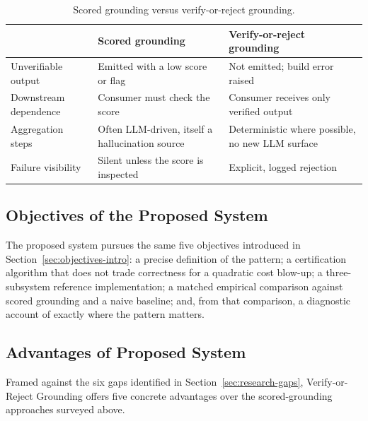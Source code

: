 \documentclass[12pt,a4paper]{report}
\newcommand{\headrow}{\rowcolor{navy}}
\newcommand{\hd}[1]{{\color{white}\bfseries #1}}
\begin{document}
\begin{table}[H]
\centering
\caption{Scored grounding versus verify-or-reject grounding.}
\label{tab:contrast}
\begin{tabular}{@{}p{3.4cm}p{5.0cm}p{5.0cm}@{}}
\toprule
\headrow \hd{} & \hd{Scored grounding} & \hd{Verify-or-reject grounding} \\
\midrule
Unverifiable output & Emitted with a low score or flag & Not emitted; build error raised \\
Downstream dependence & Consumer must check the score & Consumer receives only verified output \\
Aggregation steps & Often LLM-driven, itself a hallucination source & Deterministic where possible, no new LLM surface \\
Failure visibility & Silent unless the score is inspected & Explicit, logged rejection \\
\bottomrule
\end{tabular}
\end{table}

\subsection{Objectives of the Proposed System}
The proposed system pursues the same five objectives introduced in
Section~\ref{sec:objectives-intro}: a precise definition of the pattern; a
certification algorithm that does not trade correctness for a quadratic cost
blow-up; a three-subsystem reference implementation; a matched empirical
comparison against scored grounding and a naive baseline; and, from that
comparison, a diagnostic account of exactly where the pattern matters.

\subsection{Advantages of Proposed System}
Framed against the six gaps identified in Section~\ref{sec:research-gaps},
Verify-or-Reject Grounding offers five concrete advantages over the
scored-grounding approaches surveyed above.
\end{document}

